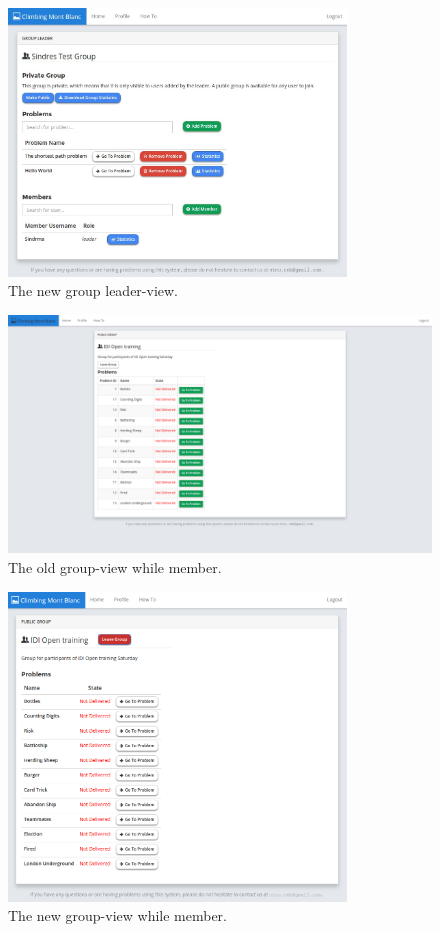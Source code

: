 \begin{figure}[h!]
    \centering
    \includegraphics[width=0.8\textwidth]{screenshots/leader.jpg}
    \caption[]{The new group leader-view.}
    \label{fig:apdx-new-leader}
\end{figure}

\begin{figure}[h!]
    \centering
    \includegraphics[width=1.0\textwidth]{oldscreenshots/group.png}
    \caption[]{The old group-view while member.}
    \label{fig:apdx-old-group}
\end{figure}

\begin{figure}[h!]
    \centering
    \includegraphics[width=0.8\textwidth]{screenshots/group.png}
    \caption[]{The new group-view while member.}
    \label{fig:apdx-new-group}
\end{figure}

